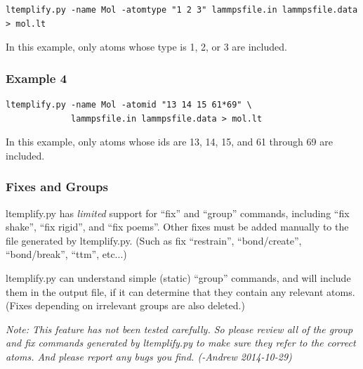 \documentclass[11pt]{article}
\begin{document}
\begin{verbatim}
ltemplify.py -name Mol -atomtype "1 2 3" lammpsfile.in lammpsfile.data > mol.lt
\end{verbatim}

    In this example, only atoms whose type is 1, 2, or 3 are included.

\subsubsection*{Example 4}

\begin{verbatim}
ltemplify.py -name Mol -atomid "13 14 15 61*69" \
             lammpsfile.in lammpsfile.data > mol.lt
\end{verbatim}

    In this example, only atoms whose ids are 
    13, 14, 15, and 61 through 69 are included.



\subsubsection{ Fixes and Groups }
\label{sec:ltemplify_fix_group}

ltemplify.py has \textit{limited} support for ``fix'' and ``group'' commands,
including ``fix shake'', ``fix rigid'', and ``fix poems''.
Other fixes must be added manually to the file generated by ltemplify.py.
(Such as fix ``restrain'', ``bond/create'', ``bond/break'', ``ttm'', etc...)

ltemplify.py can understand simple (static) ``group'' commands, and will include them in the output file, if it can determine that they contain any relevant atoms.  (Fixes depending on irrelevant groups are also deleted.)


\textit{Note: This feature has not been tested carefully.  So please review all of the group and fix commands generated by ltemplify.py to make sure they refer to the correct atoms.  And please report any bugs you find. (-Andrew 2014-10-29)}
\end{document}
